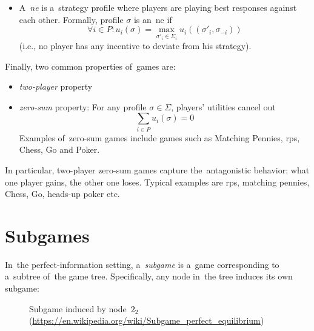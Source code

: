 \begin{itemize}
  \item A~\emph{\acrfull{ne}} is a~strategy profile where players are playing best responses against each other.
    Formally, profile $\sigma$ is an~\acrshort{ne} if
    \[ \forall i \in P\colon u_i (\sigma) = \max _{\sigma'_i \in \Sigma_i} u_i ((\sigma'_i, \sigma_{-i})) \]
    (i.e., no player has any incentive to deviate from his strategy).
\end{itemize}

Finally, two common properties of~games are:
\begin{itemize}
  \item \emph{two-player} property
  \item \emph{zero-sum} property:
    For any profile $\sigma \in \Sigma$, players' utilities cancel out
    \[ \sum _{i \in P} u _i (\sigma) = 0 \]
    Examples of~zero-sum games include games such as Matching Pennies, \acrshort{rps}, Chess, Go and Poker.
\end{itemize}
In particular, two-player zero-sum games capture the~antagonistic behavior:
what one player gains, the other one loses.
Typical examples are \acrshort{rps}, matching pennies, Chess, Go, heads-up poker etc.

\section{Subgames}
In~the perfect-information setting, a~\emph{subgame} is a~game corresponding to a~subtree of~the game tree.
Specifically, any node in~the tree induces its own subgame:
\begin{figure}[H]
  \centering
  \scriptsize
  \def\svgwidth{.7\textwidth}
  
  \def\captionTitle{Subgame induced by node~$2_2$}
  \caption[\captionTitle]{\captionTitle{}\\ (\href{https://en.wikipedia.org/wiki/Subgame_perfect_equilibrium}{https://en.wikipedia.org/wiki/Subgame\_perfect\_equilibrium})}
  \label{fig:ext-form-subgame}
\end{figure}


